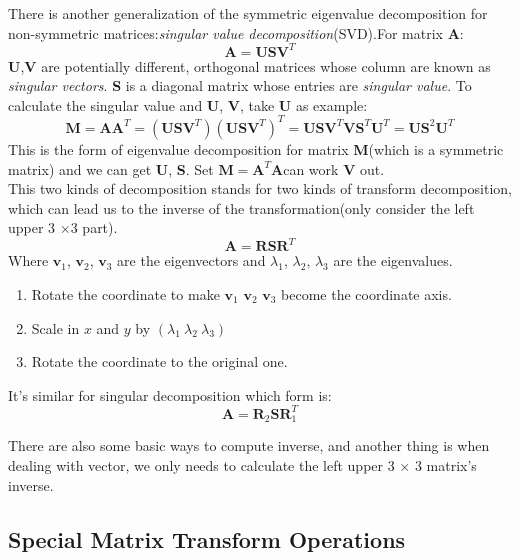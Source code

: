 \documentclass[10pt, a4paper]{article}
\begin{document}
                There is another generalization of the symmetric eigenvalue decomposition for non-symmetric matrices:\emph{singular value decomposition}(SVD).For matrix \textbf{A}: 
                    $$\textbf{A} = \textbf{USV}^T$$
                \indent \textbf{U},\textbf{V} are potentially different, orthogonal matrices whose column are known as \emph{singular vectors}. \textbf{S} is a diagonal matrix whose entries are \emph{singular value}. To calculate the singular value and \textbf{U}, \textbf{V}, take \textbf{U} as example:
                    $$\textbf{M} = \textbf{AA}^T = (\textbf{USV}^{T})(\textbf{USV}^T)^T = \textbf{USV}^T\textbf{V}\textbf{S}^T\textbf{U}^T = \textbf{U}\textbf{S}^2\textbf{U}^T$$
                \indent This is the form of eigenvalue decomposition for matrix \textbf{M}(which is a symmetric matrix) and we can get \textbf{U}, \textbf{S}. Set $\textbf{M} = \textbf{A}^T\textbf{A}$can work \textbf{V} out.\\
                
                This two kinds of decomposition stands for two kinds of transform decomposition, which can lead us to the inverse of the transformation(only consider the left upper 3 $\times 3$ part). 
                $$\textbf{A} = \textbf{RSR}^T$$ 
                \indent Where $\textbf{v}_1$, $\textbf{v}_2$, $\textbf{v}_3$ are the eigenvectors and $\lambda_1$, $\lambda_2$, $\lambda_3$ are the eigenvalues.
                \begin{enumerate}
                    \item  Rotate the coordinate to make $\textbf{v}_1$ $\textbf{v}_2$ $\textbf{v}_3$ become the coordinate axis.
                    \item Scale in $x$ and $y$ by $(\lambda_1\ \lambda_2\ \lambda_3)$
                    \item Rotate the coordinate to the original one.
                \end{enumerate}

                \indent It's similar for singular decomposition which form is: 
                $$\textbf{A} = \textbf{R}_2\textbf{S}\textbf{R}_1^T$$

                There are also some basic ways to compute inverse, and another thing is when dealing with vector, we only needs to calculate the left upper 3 $\times$ 3 matrix's inverse.
                \newpage

        \subsection{Special Matrix Transform Operations}
\end{document}
